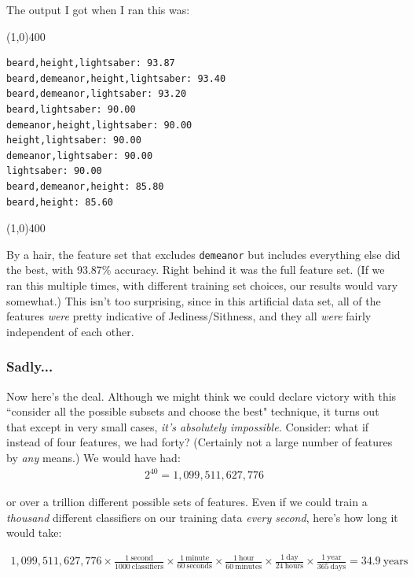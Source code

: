 \documentclass[12pt]{article}
\begin{document}
\pagebreak
The output I got when I ran this was:

\begin{center}
\line(1,0){400}
\end{center}
\footnotesize
\begin{Verbatim}[fontsize=small,samepage=true,frame=none]
beard,height,lightsaber: 93.87
beard,demeanor,height,lightsaber: 93.40
beard,demeanor,lightsaber: 93.20
beard,lightsaber: 90.00
demeanor,height,lightsaber: 90.00
height,lightsaber: 90.00
demeanor,lightsaber: 90.00
lightsaber: 90.00
beard,demeanor,height: 85.80
beard,height: 85.60
\end{Verbatim}
\normalsize
\begin{center}
\line(1,0){400}
\end{center}

By a hair, the feature set that excludes \texttt{demeanor} but includes
everything else did the best, with 93.87\% accuracy. Right behind it was the
full feature set. (If we ran this multiple times, with different training set
choices, our results would vary somewhat.) This isn't too surprising, since in
this artificial data set, all of the features \textit{were} pretty indicative
of Jediness/Sithness, and they all \textit{were} fairly independent of each
other.

\subsubsection{Sadly...}

Now here's the deal. Although we might think we could declare victory with
this ``consider all the possible subsets and choose the best" technique, it
turns out that except in very small cases, \textit{it's absolutely
impossible.} Consider: what if instead of four features, we had forty?
(Certainly not a large number of features by \textit{any} means.) We would
have had:
\begin{align*}
2^{40} = 1,099,511,627,776
\end{align*}

or over a trillion different possible sets of features. Even if we could train
a \textit{thousand} different classifiers on our training data \textit{every
second}, here's how long it would take:

\footnotesize
\begin{align*}
1,099,511,627,776 \times 
    \frac{1\ \textrm{second}}{1000\ \textrm{classifiers}} \times
    \frac{1\ \textrm{minute}}{60\ \textrm{seconds}} \times
    \frac{1\ \textrm{hour}}{60\ \textrm{minutes}} \times
    \frac{1\ \textrm{day}}{24\ \textrm{hours}} \times
    \frac{1\ \textrm{year}}{365\ \textrm{days}} = 34.9\ \textrm{years}
\end{align*}
\end{document}
